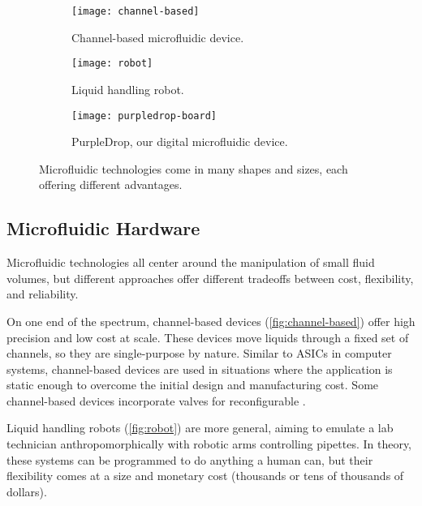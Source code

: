 \documentclass[sigconf, screen]{acmart}
\begin{document}
\begin{figure}
  \centering
  \captionsetup[subfigure]{font=small, justification=raggedright}
  \begin{subfigure}[t]{0.3\linewidth}
    \centering
    \texttt{[image: channel-based]}
    \caption{Channel-based microfluidic device. \cite{channel-img}}
    \label{fig:channel-based}
  \end{subfigure}
  \hfill
  \begin{subfigure}[t]{0.3\linewidth}
    \centering
    \texttt{[image: robot]}
    \caption{Liquid handling robot. \cite{robot-img}}
    \label{fig:robot}
  \end{subfigure}
  \hfill
  \begin{subfigure}[t]{0.3\linewidth}
    \centering
    \texttt{[image: purpledrop-board]}
    \caption{PurpleDrop, our digital microfluidic device.}
    \label{fig:purpledrop-dmf}
  \end{subfigure}

  \caption{
    Microfluidic technologies come in many shapes and sizes, each offering different advantages.
  }
  \label{fig:microfluidic-types}
\end{figure}

\subsection{Microfluidic Hardware}

Microfluidic technologies all center around the manipulation of small fluid volumes, but different approaches offer different tradeoffs between cost, flexibility, and reliability.

On one end of the spectrum, channel-based devices (\autoref{fig:channel-based}) offer high precision and low cost at scale.
These devices move liquids through a fixed set of channels, so they are single-purpose by nature.
Similar to ASICs in computer systems, channel-based devices are used in situations where the application is static enough to overcome the initial design and manufacturing cost.
Some channel-based devices incorporate valves for reconfigurable \cite{amin2007aquacore}.

Liquid handling robots (\autoref{fig:robot}) are more general, aiming to emulate a lab technician anthropomorphically with robotic arms controlling pipettes.
In theory, these systems can be programmed to do anything a human can, but their flexibility comes at a size and monetary cost (thousands or tens of thousands of dollars).
\end{document}
